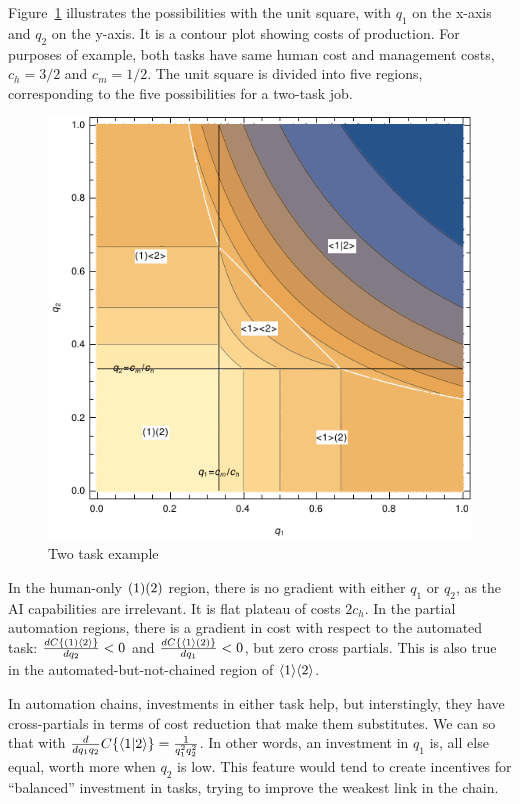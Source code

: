 \documentclass{article}
\begin{document}
Figure~\ref{fig:diagram} illustrates the possibilities with the unit square, with $q_1$ on the x-axis and $q_2$ on the y-axis.
It is a contour plot showing costs of production.
For purposes of example, both tasks have same human cost and management costs, $c_h = 3/2$ and $c_m = 1/2$. 
The unit square is divided into five regions, corresponding to the five possibilities for a two-task job.

\begin{figure}
  \caption{Two task example} \label{fig:diagram}
  \centering
    \includegraphics[width = 0.7 \linewidth]{images/diagram.pdf}
\end{figure}

In the human-only $( 1 )( 2 )$ region, there is no gradient with either $q_1$ or $q_2$, as the AI capabilities are irrelevant.
It is flat plateau of costs $2c_h$.
In the partial automation regions, there is a gradient in cost with respect to the automated task: $\frac{d C\{ ( 1 )\langle 2 \rangle \}}{dq_2} < 0$ and $\frac{d C\{ \langle 1 \rangle( 2 ) \}}{dq_1} < 0$, but zero cross partials.
This is also true in the automated-but-not-chained region of $\langle 1 \rangle\langle 2 \rangle$.

In automation chains, investments in either task help, but interstingly, they have cross-partials in terms of cost reduction that make them substitutes.
We can so that with $\frac{d}{d q_1 q_2} C\{ \langle 1|2 \rangle \} = \frac{1}{q_1^2q_2^2}$.
In other words, an investment in $q_1$ is, all else equal, worth more when $q_2$ is low.
This feature would tend to create incentives for ``balanced'' investment in tasks, trying to improve the weakest link in the chain.
\end{document}

